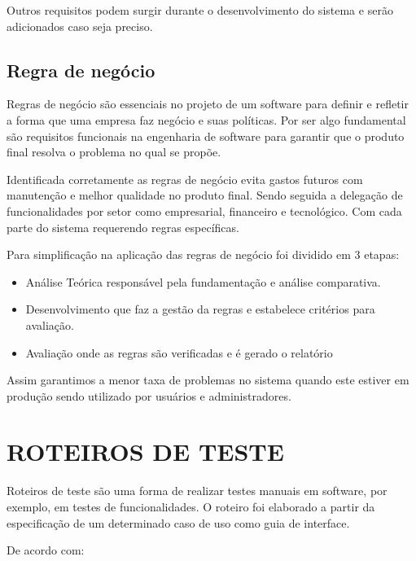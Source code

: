 \documentclass[
12pt,				%
oneside,			%
a4paper,			%
section=TITLE,
brazil,				%
]{abntex2}
\let\oldsection\section
\renewcommand\section{\clearpage\oldsection}
\begin{document}
  Outros requisitos podem surgir durante o desenvolvimento do sistema e serão
  adicionados caso seja preciso.

  \subsection{Regra de negócio}

  Regras de negócio são essenciais no projeto de um software para definir e
  refletir a forma que uma empresa faz negócio e suas políticas. Por ser algo
  fundamental são requisitos funcionais na engenharia de software para garantir
  que o produto final resolva o problema no qual se propõe.

  Identificada corretamente as regras de negócio evita gastos futuros com
  manutenção e melhor qualidade no produto final. Sendo seguida a delegação de
  funcionalidades por setor como empresarial, financeiro e tecnológico. Com cada
  parte do sistema requerendo regras específicas.

  Para simplificação na aplicação das regras de negócio foi dividido em 3 etapas:

  \begin{itemize}
    \item Análise Teórica responsável pela fundamentação e análise comparativa.
    \item Desenvolvimento que faz a gestão da regras e estabelece critérios para
      avaliação.
    \item Avaliação onde as regras são verificadas e é gerado o relatório
  \end{itemize}

  Assim garantimos a menor taxa de problemas no sistema quando este estiver em
  produção sendo utilizado por usuários e administradores.

  \section{ROTEIROS DE TESTE}

  Roteiros de teste são uma forma de realizar testes manuais em software, por
  exemplo, em testes de funcionalidades. O roteiro foi elaborado a partir da
  especificação de um determinado caso de uso como guia de interface.

  De acordo com\cite{rios2013teste}:
\end{document}
